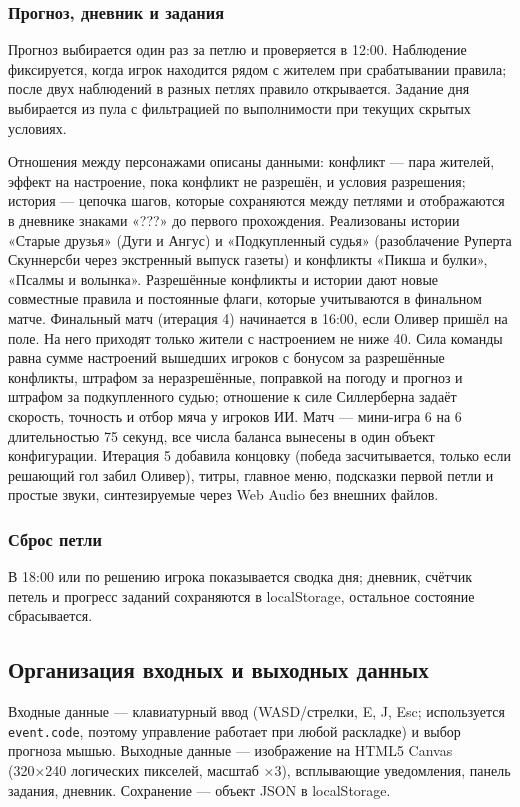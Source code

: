 \documentclass[12pt]{article}
\begin{document}
\subsubsection{Прогноз, дневник и задания}
Прогноз выбирается один раз за петлю и проверяется в 12:00. Наблюдение фиксируется, когда игрок находится рядом с жителем при срабатывании правила; после двух наблюдений в разных петлях правило открывается. Задание дня выбирается из пула с фильтрацией по выполнимости при текущих скрытых условиях.

Отношения между персонажами описаны данными: конфликт — пара жителей, эффект на настроение, пока конфликт не разрешён, и условия разрешения; история — цепочка шагов, которые сохраняются между петлями и отображаются в дневнике знаками «???» до первого прохождения. Реализованы истории «Старые друзья» (Дуги и Ангус) и «Подкупленный судья» (разоблачение Руперта Скуннерсби через экстренный выпуск газеты) и конфликты «Пикша и булки», «Псалмы и волынка». Разрешённые конфликты и истории дают новые совместные правила и постоянные флаги, которые учитываются в финальном матче. Финальный матч (итерация 4) начинается в 16:00, если Оливер пришёл на поле. На него приходят только жители с настроением не ниже 40. Сила команды равна сумме настроений вышедших игроков с бонусом за разрешённые конфликты, штрафом за неразрешённые, поправкой на погоду и прогноз и штрафом за подкупленного судью; отношение к силе Силлерберна задаёт скорость, точность и отбор мяча у игроков ИИ. Матч — мини-игра 6 на 6 длительностью 75 секунд, все числа баланса вынесены в один объект конфигурации. Итерация 5 добавила концовку (победа засчитывается, только если решающий гол забил Оливер), титры, главное меню, подсказки первой петли и простые звуки, синтезируемые через Web Audio без внешних файлов.
\subsubsection{Сброс петли}
В 18:00 или по решению игрока показывается сводка дня; дневник, счётчик петель и прогресс заданий сохраняются в localStorage, остальное состояние сбрасывается.

\subsection{Организация входных и выходных данных}
Входные данные — клавиатурный ввод (WASD/стрелки, E, J, Esc; используется \texttt{event.code}, поэтому управление работает при любой раскладке) и выбор прогноза мышью. Выходные данные — изображение на HTML5 Canvas (320×240 логических пикселей, масштаб ×3), всплывающие уведомления, панель задания, дневник. Сохранение — объект JSON в localStorage.
\end{document}
